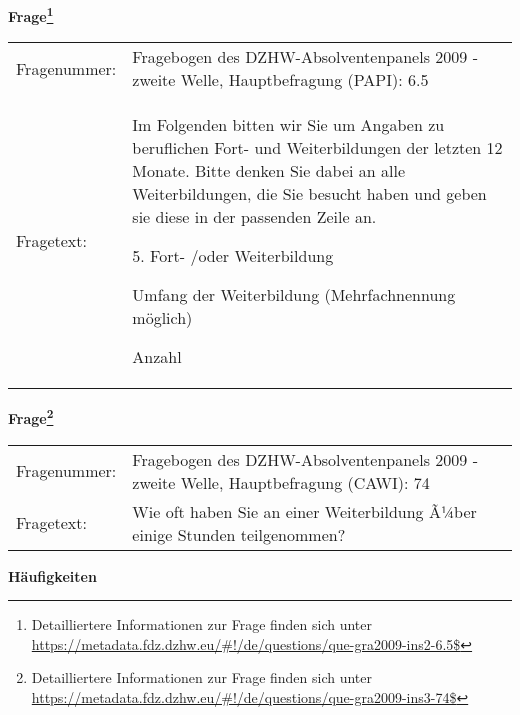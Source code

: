 				\vspace*{0.5cm}
                \noindent\textbf{Frage\footnote{Detailliertere Informationen zur Frage finden sich unter
		              \url{https://metadata.fdz.dzhw.eu/\#!/de/questions/que-gra2009-ins2-6.5$}}}\\
				\begin{tabularx}{\hsize}{@{}lX}
					Fragenummer: &
					  Fragebogen des DZHW-Absolventenpanels 2009 - zweite Welle, Hauptbefragung (PAPI):
					  6.5
 \\
					Fragetext: & Im Folgenden bitten wir Sie um Angaben zu beruflichen Fort- und Weiterbildungen der letzten 12 Monate. Bitte denken Sie dabei an alle Weiterbildungen, die Sie besucht haben und geben sie diese in der passenden Zeile an.\par  5. Fort- /oder Weiterbildung\par  Umfang der Weiterbildung (Mehrfachnennung möglich)\par  Anzahl \\
				\end{tabularx}
				\vspace*{0.5cm}
                \noindent\textbf{Frage\footnote{Detailliertere Informationen zur Frage finden sich unter
		              \url{https://metadata.fdz.dzhw.eu/\#!/de/questions/que-gra2009-ins3-74$}}}\\
				\begin{tabularx}{\hsize}{@{}lX}
					Fragenummer: &
					  Fragebogen des DZHW-Absolventenpanels 2009 - zweite Welle, Hauptbefragung (CAWI):
					  74
 \\
					Fragetext: & Wie oft haben Sie an einer Weiterbildung Ã¼ber einige Stunden teilgenommen? \\
				\end{tabularx}





        		\vspace*{0.5cm}
                \noindent\textbf{Häufigkeiten}

